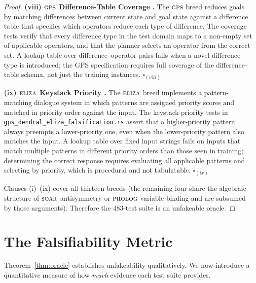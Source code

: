 \begin{proof}
\medskip\noindent
\textbf{(viii) $\textsc{gps}$ Difference-Table Coverage \cite{newell1963gps}.}
The $\textsc{gps}$ breed reduces goals by matching differences between current
state and goal state against a difference table that specifies which
operators reduce each type of difference.  The coverage tests verify that
every difference type in the test domain maps to a non-empty set of
applicable operators, and that the planner selects an operator from the
correct set.  A lookup table over difference--operator pairs fails when a
novel difference type is introduced; the GPS specification requires full
coverage of the difference-table schema, not just the training instances.
\qquad $\square_{(viii)}$

\medskip\noindent
\textbf{(ix) $\textsc{eliza}$ Keystack Priority \cite{weizenbaum1966eliza}.}
The $\textsc{eliza}$ breed implements a pattern-matching dialogue system in which
patterns are assigned priority scores and matched in priority order against
the input.  The keystack-priority tests in
\texttt{gps\_dendral\_eliza\_falsification.rs} assert that a higher-priority
pattern always preempts a lower-priority one, even when the lower-priority
pattern also matches the input.  A lookup table over fixed input strings
fails on inputs that match multiple patterns in different priority orders
than those seen in training; determining the correct response requires
evaluating all applicable patterns and selecting by priority, which is
procedural and not tabulatable.  \qquad $\square_{(ix)}$

\medskip\noindent
Clauses (i)--(ix) cover all thirteen breeds (the remaining four share the
algebraic structure of $\textsc{soar}$ antisymmetry or $\textsc{prolog}$ variable-binding
and are subsumed by those arguments).  Therefore the 483-test suite is an
unfakeable oracle.
\end{proof}

\section{The Falsifiability Metric}
\label{sec:falsifiability-metric}

Theorem~\ref{thm:oracle} establishes unfakeability qualitatively.  We now
introduce a quantitative measure of how \emph{much} evidence each test
suite provides.

